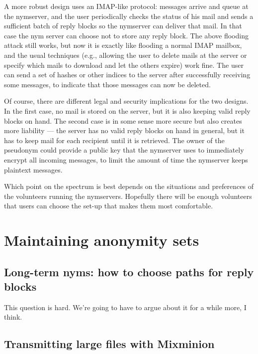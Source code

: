 \documentclass{llncs}
\begin{document}
A more robust design uses an IMAP-like protocol: messages arrive and queue
at the nymserver, and the user periodically checks the status of his mail
and sends a sufficient batch of reply blocks so the nymserver can deliver
that mail. In that case the nym server can choose not to store any reply block.
The above flooding attack still works, but now it is exactly
like flooding a normal IMAP mailbox, and the usual techniques (e.g.,
allowing the user to delete mails at the server or specify which mails to
download and let the others expire) work fine. The user can send a set
of hashes or other indices to the server after successfully receiving
some messages, to indicate that those messages can now be deleted.

Of course, there are different legal and security implications for the two
designs. In the first case, no mail is stored on the server, but it is also
keeping valid reply blocks on hand. The second case is in some sense more
secure but also creates more liability --- the server has no valid reply
blocks on hand in general, but it has to keep mail for each recipient
until it is retrieved. The owner of the pseudonym could provide a public
key that the nymserver uses to immediately encrypt all incoming messages,
to limit the amount of time the nymserver keeps plaintext messages.

Which point on the spectrum is best depends on the situations and
preferences of the volunteers running the nymservers. Hopefully there
will be enough volunteers that users can choose the set-up that makes
them most comfortable.


\section{Maintaining anonymity sets}

\subsection{Long-term nyms: how to choose paths for reply blocks}
\label{subsec:choosing-paths}

This question is hard. We're going to have to argue about it for a
while more, I think.

\subsection{Transmitting large files with Mixminion}
\end{document}

